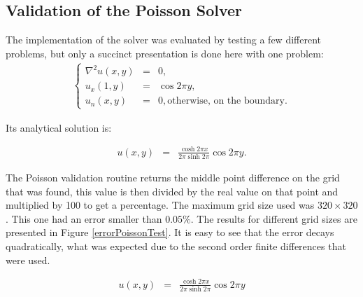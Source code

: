 \documentclass[journal]{IEEEtran}
\begin{document}
\subsection{Validation of the Poisson Solver}

The implementation of the solver was evaluated by testing a few different problems, but only a succinct presentation is done here with one problem: \begin{eqnarray}
\left\{\begin{array}{ccl}
\nabla^2u(x,y) & = & 0,\\
u_x(1,y) & = & \cos 2\pi y,\\
u_n(x,y) & = & 0, \textrm{otherwise, on the boundary}.
\end{array}\right. \label{poissonTest1}
\end{eqnarray}

Its analytical solution is:

\begin{eqnarray}
u(x,y) & = & \frac{\cosh 2\pi x}{2\pi \sinh 2\pi}\cos 2 \pi y .\label{solutionPoissonTest1}
\end{eqnarray}


The Poisson validation routine returns the middle point difference on the grid that was found, this value is then divided by the real value on that point and multiplied by 100 to get a percentage. The maximum grid size used was $320\times 320$. This one had an error smaller than $0.05\%$. The results for different grid sizes are presented in Figure \ref{errorPoissonTest}. It is easy to see that the error decays quadratically, what was expected due to the second order finite differences that were used.



\begin{eqnarray}
u(x,y) & = & \frac{\cosh 2\pi x}{2\pi \sinh 2\pi}\cos 2 \pi y \label{solutionPoissonTest1}
\end{eqnarray}
\end{document}
